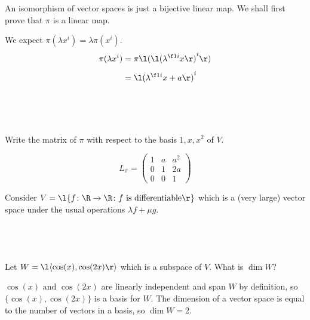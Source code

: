 \documentclass[a4paper]{article}
\begin{document}
An isomorphism of vector spaces is just a bijective linear map. We shall first prove that $\pi$ is a linear map.

We expect $\pi(\lambda x^i) = \lambda \pi(x^i)$.
\begin{align*}
\pi(\lambda x^i) &= \pi\l( {\l( \lambda^{\f1i} x \r)}^i \r) \\[1ex]
&= {\l( \lambda^{\f1i} x + a \r)}^i \\[1ex]
\end{align*}


\subsection{~} %

\begin{questionbody}
Write the matrix of $\pi$ with respect to the basis $1, x, x^2$ of $V$.
\end{questionbody}

\[ L_\pi = \begin{pmatrix} 1 & a & a^2 \\ 0 & 1 & 2a \\ 0 & 0 & 1 \end{pmatrix} \]



\begin{questionbody}
Consider $V = \l\{ f \colon \R \to \R \colon f \text{ is differentiable} \r\}$ which is a (very large) vector space under the usual operations $\lambda f + \mu g$.
\end{questionbody}

\subsection{~} %

\begin{questionbody}
Let $W = \l\langle \cos(x), \cos(2x) \r\rangle$ which is a subspace of $V$. What is $\dim W$?
\end{questionbody}

$\cos(x)$ and $\cos(2x)$ are linearly independent and span $W$ by definition, so $\{\cos(x), \cos(2x)\}$ is a basis for $W$. The dimension of a vector space is equal to the number of vectors in a basis, so $\dim W = 2$.

\subsection{~} %
\end{document}
